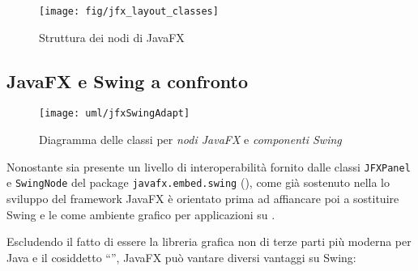             \begin{figure}[htbp]
                \centering
                \texttt{[image: fig/jfx\_layout\_classes]}
                \caption{Struttura dei nodi di JavaFX}
                \label{fig:jfxNode}
            \end{figure}

        \subsection{JavaFX e Swing a confronto}\label{subsec:jfxVantaggi}

            \begin{figure}[hbpt]
                \centering
                \texttt{[image: uml/jfxSwingAdapt]}
                \caption{Diagramma delle classi  per \emph{nodi JavaFX} e \emph{componenti Swing}}
                \label{fig:jfxSwingAdapt}
            \end{figure}

            Nonostante sia presente un livello di interoperabilità fornito dalle classi  \texttt{JFXPanel} e \texttt{SwingNode} del package \texttt{javafx\dothyp embed\dothyp swing} (), come già sostenuto nella  lo sviluppo del framework JavaFX è orientato prima ad affiancare poi a sostituire Swing e le  come ambiente grafico per applicazioni su .

            Escludendo il fatto di essere la libreria grafica non di terze parti più moderna per Java e il cosiddetto ``'', JavaFX può vantare diversi vantaggi su Swing:

